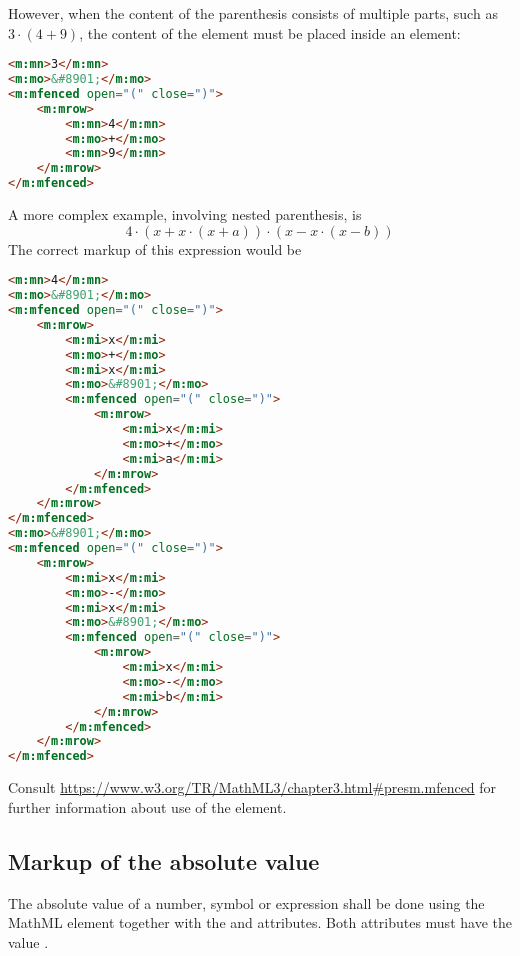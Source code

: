 \documentclass[english,a4paper,11pt]{article}
\begin{document}
However, when the content of the parenthesis consists of multiple parts, such as $3 \cdot (4 + 9)$, the content of the  element must be placed inside an  element:
\begin{lstlisting}[language=HTML]
<m:mn>3</m:mn>
<m:mo>&#8901;</m:mo>
<m:mfenced open="(" close=")">
	<m:mrow>
		<m:mn>4</m:mn>
		<m:mo>+</m:mo>
		<m:mn>9</m:mn>
	</m:mrow>
</m:mfenced>
\end{lstlisting}
A more complex example, involving nested parenthesis, is
\begin{equation}
4 \cdot (x + x \cdot (x +a)) \cdot (x - x\cdot (x -b))
\end{equation}
The correct markup of this expression would be
\begin{lstlisting}[language=HTML]
<m:mn>4</m:mn>
<m:mo>&#8901;</m:mo>
<m:mfenced open="(" close=")">
	<m:mrow>
		<m:mi>x</m:mi>
		<m:mo>+</m:mo>
		<m:mi>x</m:mi>
		<m:mo>&#8901;</m:mo>
		<m:mfenced open="(" close=")">
			<m:mrow>
				<m:mi>x</m:mi>
				<m:mo>+</m:mo>
				<m:mi>a</m:mi>
			</m:mrow>
		</m:mfenced>
	</m:mrow>
</m:mfenced>
<m:mo>&#8901;</m:mo>
<m:mfenced open="(" close=")">
	<m:mrow>
        <m:mi>x</m:mi>
        <m:mo>-</m:mo>
        <m:mi>x</m:mi>
        <m:mo>&#8901;</m:mo>
        <m:mfenced open="(" close=")">
            <m:mrow>
                <m:mi>x</m:mi>
                <m:mo>-</m:mo>
                <m:mi>b</m:mi>
            </m:mrow>
        </m:mfenced>
	</m:mrow>
</m:mfenced>
\end{lstlisting}


\bigskip
Consult \url{https://www.w3.org/TR/MathML3/chapter3.html#presm.mfenced} for further information about use of the  element.

\subsection{Markup of the absolute value}
The absolute value of a number, symbol or expression shall be done using the MathML element  together with the  and  attributes. Both attributes must have the value \markup{|}.
\end{document}
